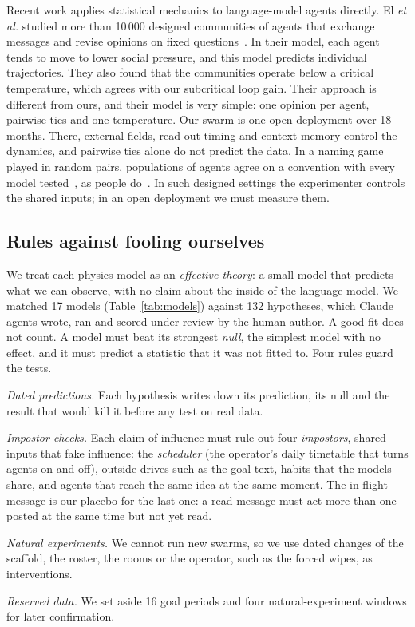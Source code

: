 Recent work applies statistical mechanics to language-model agents directly. El \emph{et al.} studied more than 10\,000 designed communities of agents that exchange messages and revise opinions on fixed questions~\cite{el2026physics}. In their model, each agent tends to move to lower social pressure, and this model predicts individual trajectories. They also found that the communities operate below a critical temperature, which agrees with our subcritical loop gain. Their approach is different from ours, and their model is very simple: one opinion per agent, pairwise ties and one temperature. Our swarm is one open deployment over 18 months. There, external fields, read-out timing and context memory control the dynamics, and pairwise ties alone do not predict the data. In a naming game played in random pairs, populations of agents agree on a convention with every model tested~\cite{ashery2025}, as people do~\cite{centola2015}. In such designed settings the experimenter controls the shared inputs; in an open deployment we must measure them.

\subsection*{Rules against fooling ourselves}



We treat each physics model as an \emph{effective theory}: a small model that predicts what we can observe, with no claim about the inside of the language model. We matched 17 models (Table~\ref{tab:models}) against 132 hypotheses, which Claude agents wrote, ran and scored under review by the human author. A good fit does not count. A model must beat its strongest \emph{null}, the simplest model with no effect, and it must predict a statistic that it was not fitted to. Four rules guard the tests.
\begin{tightenum}
\item \emph{Dated predictions.} Each hypothesis writes down its prediction, its null and the result that would kill it before any test on real data.
\item \emph{Impostor checks.} Each claim of influence must rule out four \emph{impostors}, shared inputs that fake influence: the \emph{scheduler} (the operator's daily timetable that turns agents on and off), outside drives such as the goal text, habits that the models share, and agents that reach the same idea at the same moment. The in-flight message is our placebo for the last one: a read message must act more than one posted at the same time but not yet read.
\item \emph{Natural experiments.} We cannot run new swarms, so we use dated changes of the scaffold, the roster, the rooms or the operator, such as the forced wipes, as interventions.
\item \emph{Reserved data.} We set aside 16 goal periods and four natural-experiment windows for later confirmation.
\end{tightenum}

